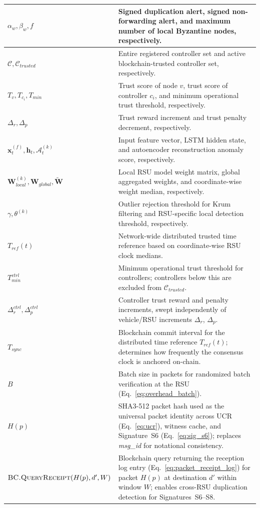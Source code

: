 \documentclass[12pt, a4paper]{report}
\begin{document}
\begin{longtable}{|m{5.0cm}|m{9.0cm}|}
\hline
$\alpha_w, \beta_w, f$ & Signed duplication alert, signed non-forwarding alert, and maximum number of local Byzantine nodes, respectively. \\
\hline
$\mathcal{C}, \mathcal{C}_{trusted}$ & Entire registered controller set and active blockchain-trusted controller set, respectively. \\
\hline
$T_v, T_{c_i}, T_{min}$ & Trust score of node $v$, trust score of controller $c_i$, and minimum operational trust threshold, respectively. \\
\hline
$\Delta_r, \Delta_p$ & Trust reward increment and trust penalty decrement, respectively. \\
\hline
$\mathbf{x}_t^{(f)}, \mathbf{h}_t, \mathcal{A}_t^{(k)}$ & Input feature vector, LSTM hidden state, and autoencoder reconstruction anomaly score, respectively. \\
\hline
$\mathbf{W}_{local}^{(k)}, \mathbf{W}_{global}, \tilde{\mathbf{W}}$ & Local RSU model weight matrix, global aggregated weights, and coordinate-wise weight median, respectively. \\
\hline
$\gamma, \theta^{(k)}$ & Outlier rejection threshold for Krum filtering and RSU-specific local detection threshold, respectively. \\
\hline
$T_{ref}(t)$ & Network-wide distributed trusted time reference based on coordinate-wise RSU clock medians. \\
\hline
$T_{min}^{ctrl}$ & Minimum operational trust threshold for controllers; controllers below this are excluded from $\mathcal{C}_{trusted}$. \\
\hline
$\Delta_r^{ctrl}, \Delta_p^{ctrl}$ & Controller trust reward and penalty increments, swept independently of vehicle/RSU increments $\Delta_r$, $\Delta_p$. \\
\hline
$T_{sync}$ & Blockchain commit interval for the distributed time reference $T_{ref}(t)$; determines how frequently the consensus clock is anchored on-chain. \\
\hline
$B$ & Batch size in packets for randomized batch verification at the \ac{RSU} (Eq.~\ref{eq:overhead_batch}). \\
\hline
$H(p)$ & SHA3-512 packet hash used as the universal packet identity across \ac{UCR} (Eq.~\ref{eq:ucr}), witness cache, and Signature~S6 (Eq.~\ref{eq:sig_s6}); replaces \textit{msg\_id} for notational consistency. \\
\hline
$\textsc{BC.QueryReceipt}(H(p),d',W)$ & Blockchain query returning the reception log entry (Eq.~\ref{eq:packet_receipt_log}) for packet $H(p)$ at destination $d'$ within window $W$; enables cross-\ac{RSU} duplication detection for Signatures~S6--S8. \\

\end{longtable}
\end{document}
